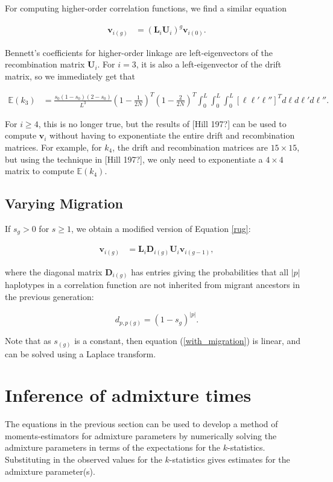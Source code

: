 \documentclass[11pt]{amsart}
\begin{document}
For computing higher-order correlation functions, we find a similar equation

\begin{align}
\mathbf{v}_{i(g)}&=
		\left(\mathbf{L}_i\mathbf{U}_i\right)^g
		\mathbf{v}_{i(0)}.
\label{rug}
\end{align}

Bennett's coefficients for higher-order linkage are left-eigenvectors of the recombination matrix $\mathbf{U}_i$. 
For $i=3$, it is also a left-eigenvector of the drift matrix, so we immediately get that 

\begin{align*}
	\mathbb{E}(k_3)&=\frac{s_0(1-s_0)(2-s_0)}{L^3}\left(1-\frac{1}{2N}\right)^T\left(1-\frac{2}{2N}\right)^T\int_0^L\int_0^L\int_0^L[\ell\ell'\ell'']^Td\ell d\ell'd\ell''.
\end{align*}

For $i\geq 4$, this is no longer true, but the results of [Hill 197?] can be used to compute $\textbf{v}_{i}$ without having to exponentiate the entire drift and recombination matrices. For example, for $k_4$, the drift and recombination matrices are $15\times 15$, but using the technique in [Hill 197?], we only need to exponentiate a $4\times 4$ matrix to compute $\mathbb{E}(k_4)$.

\subsection*{Varying Migration}
If $s_g>0$ for $s\geq 1$, we obtain a modified version of Equation \ref{rug}:

\begin{align}
\mathbf{v}_{i(g)}&=
		\mathbf{L}_i \mathbf{D}_{i(g)}\mathbf{U}_i
		\mathbf{v}_{i(g-1)},
		\label{with_migration}
\end{align}

where the diagonal matrix $\mathbf{D}_{i(g)}$ has entries giving the probabilities that all $|p|$ haplotypes in a correlation function are not inherited from migrant ancestors in the previous generation:

$$ d_{p,p(g)} = (1-s_g)^{|p|}.$$

Note that as $s_{(g)}$ is a constant, then equation (\ref{with_migration}) is linear, and can be solved using a Laplace transform. 


\section*{Inference of admixture times}
The equations in the previous section can be used to develop a method of moments-estimators for admixture parameters by numerically solving the admixture parameters in terms of the expectations for the $k$-statistics. Substituting in the observed values for the $k$-statistics gives estimates for the admixture parameter(s). 
\end{document}

